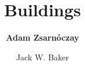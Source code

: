 %
%
%


%
%
%
%
%
%
%
%

\title{Buildings}
\author{
    \textbf{Adam Zsarnóczay}
    \and Jack W. Baker}
\tocauthor{}
%
%
\maketitle

